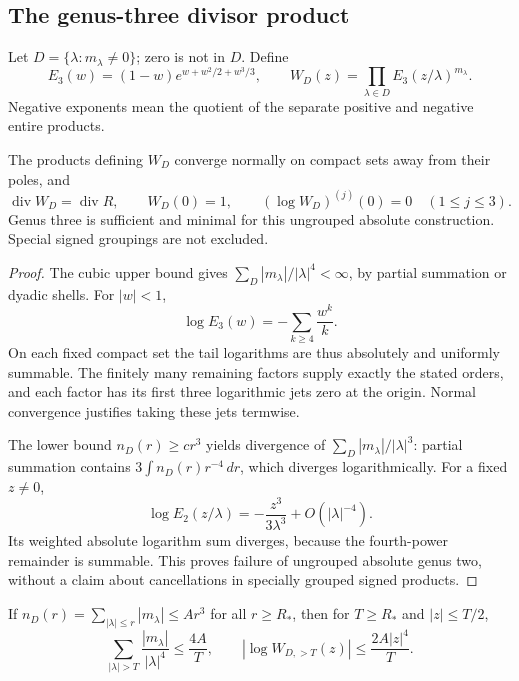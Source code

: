 \subsection{The genus-three divisor product}
Let $D=\{\lambda:m_\lambda\ne0\}$; zero is not in $D$. Define
\begin{equation}\label{eq:WD}
 E_3(w)=(1-w)e^{w+w^2/2+w^3/3},\qquad
 W_D(z)=\prod_{\lambda\in D}E_3(z/\lambda)^{m_\lambda}.
\end{equation}
Negative exponents mean the quotient of the separate positive and negative entire products.
\begin{theorem}\label{thm:regularizer}
The products defining $W_D$ converge normally on compact sets away from their poles, and
\[
 \operatorname{div}W_D=\operatorname{div}R,\qquad W_D(0)=1,\qquad
 (\log W_D)^{(j)}(0)=0\quad(1\le j\le3).
\]
Genus three is sufficient and minimal for this ungrouped absolute construction. Special signed groupings are not excluded.
\end{theorem}
\begin{proof}
The cubic upper bound gives $\sum_D|m_\lambda|/|\lambda|^4<\infty$, by partial summation or dyadic shells. For $|w|<1$,
\[
 \log E_3(w)=-\sum_{k\ge4}\frac{w^k}{k}.
\]
On each fixed compact set the tail logarithms are thus absolutely and uniformly summable. The finitely many remaining factors supply exactly the stated orders, and each factor has its first three logarithmic jets zero at the origin. Normal convergence justifies taking these jets termwise.

The lower bound $n_D(r)\ge c r^3$ yields divergence of $\sum_D|m_\lambda|/|\lambda|^3$: partial summation contains $3\int n_D(r)r^{-4}\,dr$, which diverges logarithmically. For a fixed $z\ne0$,
\[
 \log E_2(z/\lambda)=-\frac{z^3}{3\lambda^3}+O(|\lambda|^{-4}).
\]
Its weighted absolute logarithm sum diverges, because the fourth-power remainder is summable. This proves failure of ungrouped absolute genus two, without a claim about cancellations in specially grouped signed products.
\end{proof}
\begin{proposition}\label{prop:tail}
If $n_D(r)=\sum_{|\lambda|\le r}|m_\lambda|\le Ar^3$ for all $r\ge R_*$, then for $T\ge R_*$ and $|z|\le T/2$,
\begin{equation}\label{eq:tail}
 \sum_{|\lambda|>T}\frac{|m_\lambda|}{|\lambda|^4}\le\frac{4A}{T},
 \qquad |\log W_{D,>T}(z)|\le\frac{2A|z|^4}{T}.
\end{equation}
\end{proposition}

